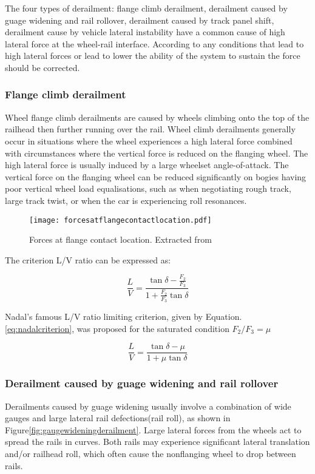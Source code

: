 The four types of derailment: flange climb derailment, derailment caused by guage widening and rail rollover, derailment caused by track panel shift, derailment cause by vehicle lateral instability have a common cause of high lateral force at the wheel-rail interface. According to \cite[Chapter 8, IV]{iwnicki2006handbook} any conditions that lead to high lateral forces or lead to lower the ability of the system to sustain the force should be corrected. 

\subsubsection{Flange climb derailment}
Wheel flange climb derailments are caused by wheels climbing onto the top of the railhead then further running over the rail. Wheel climb derailments generally occur in situations where the wheel experiences a high lateral force combined with circumstances where the vertical force is reduced on the flanging wheel. The high lateral force is usually induced by a large wheelset angle-of-attack. The vertical force on the flanging wheel can be reduced significantly on bogies having poor vertical wheel load equalisations, such as when negotiating rough track, large track twist, or when the car is experiencing roll resonances. 

\begin{figure}[h]
	\centering
	\texttt{[image: forcesatflangecontactlocation.pdf]}
	\caption{Forces at flange contact location. Extracted from \cite[Figure8.4]{iwnicki2006handbook}}
	\label{fig:forcesatflangecontactlocation}
\end{figure}

The criterion L/V ratio can be expressed as:

\begin{equation}
	\frac{L}{V}=\frac{\tan \delta -\frac{F_2}{F_3}}{1+\frac{F_2}{F_3}\tan \delta}
\end{equation}

Nadal's famous L/V ratio limiting criterion, given by Equation.\ref{eq:nadalcriterion}, was proposed for the saturated condition $F_2/F_3=\mu$

\begin{equation}\label{eq:nadalcriterion}
	\frac{L}{V}=\frac{\tan \delta - \mu}{1+ \mu \tan \delta}
\end{equation}

\subsubsection{Derailment caused by guage widening and rail rollover}
Derailments caused by guage widening usually involve a combination of wide gauges and large lateral rail defections(rail roll), as shown in Figure\ref{fig:gaugewideningderailment}. Large lateral forces from the wheels act to spread the rails in curves. Both rails may experience significant lateral translation and/or railhead roll, which often cause the nonflanging wheel to drop between rails.

